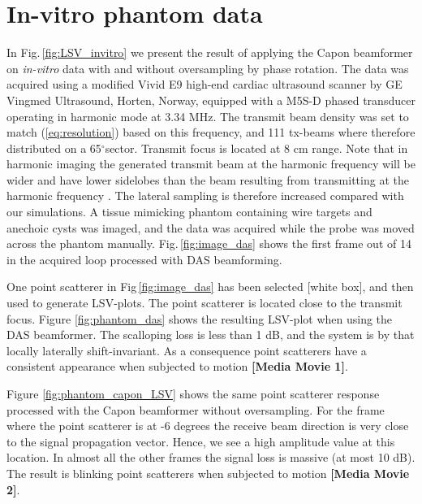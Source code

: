 \documentclass[draftcls]{IEEEtran}
\newcommand{\degree}{\ensuremath{^\circ}}
\newcommand\multimedia[1]{\textbf{{\color{red}[#1]}}}
\begin{document}
\section{In-vitro phantom data}\label{sec:res}
In Fig.\,\ref{fig:LSV_invitro} we present the result of applying the Capon beamformer on \textit{in-vitro} data with and without oversampling by phase rotation. The data was acquired using a modified Vivid E9 high-end cardiac ultrasound scanner by GE Vingmed Ultrasound, Horten, Norway, equipped with a M5S-D phased transducer operating in harmonic mode at 3.34 MHz. The transmit beam density was set to match (\ref{eq:resolution}) based on this frequency, and 111 tx-beams where therefore distributed on a 65\degree sector. Transmit focus is located at 8 cm range. Note that in harmonic imaging the generated transmit beam at the harmonic frequency will be wider and have lower sidelobes than the beam resulting from transmitting at the harmonic frequency \cite{Fedewa2004}. The lateral sampling is therefore increased compared with our simulations. A tissue mimicking phantom containing wire targets and anechoic cysts was imaged, and the data was acquired while the probe was moved across the phantom manually. Fig.\,\ref{fig:image_das} shows the first frame out of 14 in the acquired loop processed with DAS beamforming. %

One point scatterer in Fig\,\ref{fig:image_das} has been selected [white box], and then used to generate LSV-plots. The point scatterer is located close to the transmit focus. Figure \ref{fig:phantom_das} shows the resulting LSV-plot when using the DAS beamformer. The scalloping loss is less than 1 dB, and the system is by that locally laterally shift-invariant. As a consequence point scatterers have a consistent appearance when subjected to motion \multimedia{Media Movie 1}.  

Figure \ref{fig:phantom_capon_LSV} shows the same point scatterer response processed with the Capon beamformer without oversampling. For the frame where the point scatterer is at -6 degrees the receive beam direction is very close to the signal propagation vector. Hence, we see a high amplitude value at this location. In almost all the other frames the signal loss is massive (at most 10 dB). The result is blinking point scatterers when subjected to motion \multimedia{Media Movie 2}. 
\end{document}

